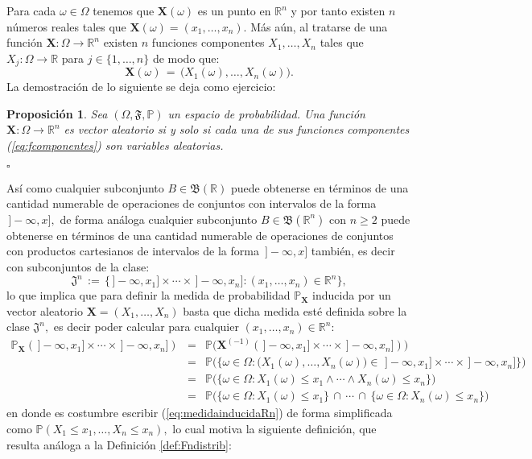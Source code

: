 \documentclass[spanish,10pt,letterpaper]{article}
\newtheorem{prop}{Proposición}
\newcommand{\prob}{\mathbb{P}}
\newcommand{\Runo}{\mathbb{R}}
\newcommand{\qed}{\begin{flushright}$\square$\end{flushright}}
\begin{document}
Para cada $\omega\in\Omega$ tenemos que $\mathbf{X}(\omega)$ es un punto en $\Runo^n$ y por tanto existen $n$ números reales tales que $\mathbf{X}(\omega)=(x_1,\ldots,x_n).$ Más aún, al tratarse de una función $\mathbf{X}:\Omega\rightarrow\Runo^n$ existen $n$ funciones componentes $X_1,\ldots,X_n$ tales que $X_j:\Omega\rightarrow\Runo$ para $j\in\{1,\ldots,n\}$ de modo que:
\begin{equation}\label{eq:fcomponentes}
    \mathbf{X}(\omega) \,=\, \big(X_1(\omega),\ldots,X_n(\omega)\big).
\end{equation}
La demostración de lo siguiente se deja como ejercicio: 

\bigskip 

\begin{prop}\label{prop:fcomponentes}
    Sea $(\Omega,\mathfrak{F},\prob)$ un espacio de probabilidad. Una función $\mathbf{X}:\Omega\rightarrow\Runo^n$ es vector aleatorio si y solo si cada una de sus funciones componentes (\ref{eq:fcomponentes}) son variables aleatorias. \qed 
\end{prop}
    
Así como cualquier subconjunto $B\in\mathfrak{B}(\Runo)$ puede obtenerse en términos de una cantidad numerable de operaciones de conjuntos con intervalos de la forma $\,]-\infty,x],$ de forma análoga cualquier subconjunto $B\in\mathfrak{B}(\Runo^n)$ con $n\geq 2$ puede obtenerse en términos de una cantidad numerable de operaciones de conjuntos con productos cartesianos de intervalos de la forma $\,]-\infty,x]$ también, es decir con subconjuntos de la clase:
\begin{equation}\label{eq:claseJn}
    \mathfrak{J}^n \,:=\, \{\,]-\infty,x_1]\times\cdots\times\,]-\infty,x_n]:(x_1,\ldots,x_n)\in\Runo^n\},
\end{equation}
lo que implica que para definir la medida de probabilidad $\prob_{\mathbf{X}}$ inducida por un vector aleatorio $\mathbf{X}=(X_1,\ldots,X_n)$ basta que dicha medida esté definida sobre la clase $\mathfrak{J}^n,$ es decir poder calcular para cualquier $(x_1,\ldots,x_n)\in\Runo^n:$
\begin{eqnarray}\label{eq:medidainducidaRn}
    \prob_{\mathbf{X}}(\,]-\infty,x_1]\times\cdots\times\,]-\infty,x_n]) &=& \prob\big(\mathbf{X}^{(-1)}(\,]-\infty,x_1]\times\cdots\times\,]-\infty,x_n])\big) \nonumber \\ 
    &=& \prob\Big(\big\{\omega\in\Omega:\big(X_1(\omega),\ldots,X_n(\omega)\big)\in\,\,]-\infty,x_1]\times\cdots\times\,]-\infty,x_n]\big\}\Big) \nonumber \\ 
    &=& \prob\Big( \big\{ \omega\in\Omega:X_1(\omega)\leq x_1 \wedge \cdots \wedge X_n(\omega)\leq x_n \big\} \Big) \nonumber \\ 
    &=& \prob\Big( \big\{\omega\in\Omega:X_1(\omega)\leq x_1\big\}\,\cap\,\cdots\,\cap\, \big\{\omega\in\Omega:X_n(\omega)\leq x_n\big\} \Big)
\end{eqnarray}
en donde es costumbre escribir (\ref{eq:medidainducidaRn}) de forma simplificada como $\prob(X_1\leq x_1,\ldots,X_n\leq x_n),$ lo cual motiva la siguiente definición, que resulta análoga a la Definición \ref{def:Fndistrib}:
\end{document}
